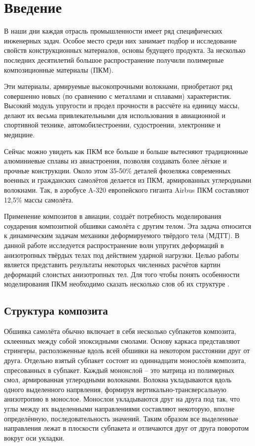 \section*{Введение}
\setcounter{subsection}{0}
	
	В наши дни каждая отрасль промышленности имеет ряд специфических инженерных задач.
	Особое место среди них занимает подбор и исследование свойств конструкционных материалов, основы будущего продукта.
	За несколько последних десятилетий большое распространение получили полимерные композиционные материалы (ПКМ).
	
	Эти материалы, армируемые высокопрочными волокнами, приобретают ряд совершенно новых (по сравнению с металлами и сплавами) характеристик.
	Высокий модуль упругости и продел прочности в рассчёте на единицу массы, делают их весьма привлекательными для использования в авиационной и спортивной технике, автомобилестроении, судостроении, электронике и медицине.
	
	Сейчас можно увидеть как ПКМ все больше и больше вытесняют традиционные алюминиевые сплавы из авиастроения, позволяя создавать более лёгкие и прочные конструкции.
	Около этом 35-50\% деталей фюзеляжа современных военных и гражданских самолётов делается из ПКМ, армированных углеродными волокнами.
	Так, в аэробусе A-320 европейского гиганта Airbus ПКМ составляют 12,5\% массы самолёта.
	
	Применение композитов в авиации, создаёт потребность моделирования соударения композитной обшивки самолёта с другим телом.
	Эта задача относится к динамическим задачам механики деформируемого твёрдого тела (МДТТ).
	В данной работе исследуется распространение волн упругих деформаций в анизотропных твёрдых телах под действием ударной нагрузки.
	Целью работы является представить результаты некоторых численных расчётов картин деформаций слоистых анизотропных тел. 
	Для того чтобы понять особенности моделирования ПКМ необходимо сказать несколько слов об их структуре \cite{simamura}.
	
\subsection*{Структура композита}
	
	Обшивка самолёта обычно включает в себя несколько субпакетов композита, склеенных между собой эпоксидными смолами. 
	Основу каркаса представляют стрингеры, расположенные вдоль всей обшивки на некотором расстоянии друг от друга.
	Отдельно взятый субпакет состоит из одиннадцати монослоёв композита, спресованных в субпакет.
	Каждый мононслой -- это матрица из полимерных смол, армированная углеродными волокнами.
	Волокна укладываются вдоль одного выделенного напрвления, формируя вертикально-трансверсальную анизотропию в монослое.
	Монослои укладываются друг на друга под так, что углы между их выделенными направлениями составляют некоторую, вполне определённую, последовательность значений.
	Таким образом все выделенные направления лежат в плоскости субпакета и отличаются друг от друга поворотом вокруг оси укладки.
	
